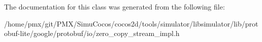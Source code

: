 The documentation for this class was generated from the following file\+:\begin{DoxyCompactItemize}
\item 
/home/pmx/git/\+P\+M\+X/\+Simu\+Cocos/cocos2d/tools/simulator/libsimulator/lib/protobuf-\/lite/google/protobuf/io/zero\+\_\+copy\+\_\+stream\+\_\+impl.\+h\end{DoxyCompactItemize}
